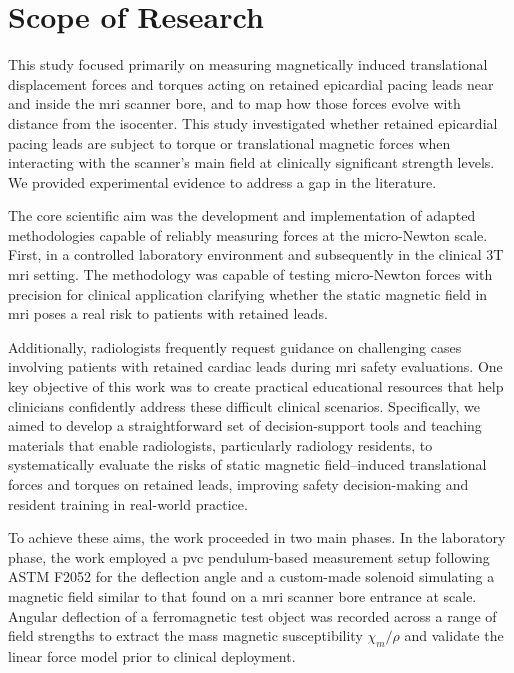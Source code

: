\section{Scope of Research}
\label{sec:Scope}

This study focused primarily on measuring magnetically induced translational displacement forces and torques acting on retained epicardial pacing leads near and inside the \gls{mri} scanner bore, and to map how those forces evolve with distance from the isocenter. This study investigated whether retained epicardial pacing leads are subject to torque or translational magnetic forces when interacting with the scanner's main field at clinically significant strength levels. We provided experimental evidence to address a gap in the literature.

The core scientific aim was the development and implementation of adapted methodologies capable of reliably measuring forces at the micro-Newton scale. First, in a controlled laboratory environment and subsequently in the clinical 3T \gls{mri} setting. The methodology was capable of testing micro-Newton forces with precision for clinical application clarifying whether the static magnetic field in \gls{mri} poses a real risk to patients with retained leads. 

Additionally, radiologists frequently request guidance on challenging cases involving patients with retained cardiac leads during \gls{mri} safety evaluations. One key objective of this work was to create practical educational resources that help clinicians confidently address these difficult clinical scenarios. Specifically, we aimed to develop a straightforward set of decision-support tools and teaching materials that enable radiologists, particularly radiology residents, to systematically evaluate the risks of static magnetic field–induced translational forces and torques on retained leads, improving safety decision-making and resident training in real-world practice. 

To achieve these aims, the work proceeded in two main phases. In the laboratory phase, the work employed a \gls{pvc} pendulum-based measurement setup following ASTM F2052 for the deflection angle and a custom-made solenoid simulating a magnetic field similar to that found on a \gls{mri} scanner bore entrance at scale. Angular deflection of a ferromagnetic test object was recorded across a range of field strengths to extract the mass magnetic susceptibility $\chi_m / \rho$ and validate the linear force model prior to clinical deployment.

